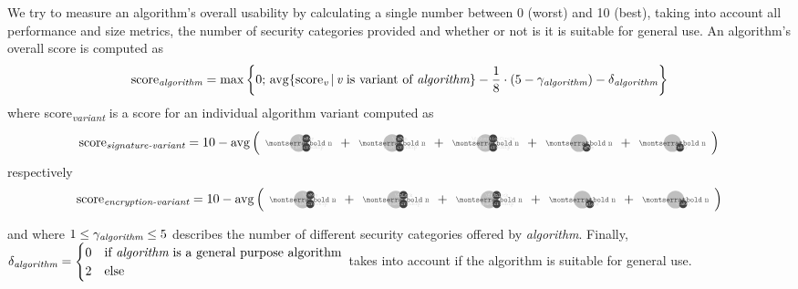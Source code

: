 \documentclass[11pt,english,a4paper, landscape]{scrartcl}
\begin{document}
	\scriptsize
	We try to measure an algorithm's overall usability by calculating a single number between 0 (worst) and 10 (best), taking into account all performance and size metrics, the number of security categories provided and whether or not is it is suitable for general use. An algorithm's overall score is computed as
	\begin{align*}
		\textnormal{score\textsubscript{\itshape algorithm}} = \max\left\{0;\,\operatorname{avg}\{\textnormal{score}_\textnormal{\itshape v}\,|\, \textnormal{{\itshape v} is variant of {\itshape algorithm}}\} - \frac{1}{8}\cdot\left(5-\gamma_\textnormal{\itshape algorithm}\right) - \delta_\textnormal{\itshape algorithm}\right\}
	\end{align*}
	where \textnormal{score\textsubscript{\itshape variant}} is a score for an individual algorithm variant computed as
			\begin{align*}
			\textnormal{score\textsubscript{\itshape signature-variant}} = 10 - \avg\left({\scriptsize
			\tripleicon{\montserratbold n}{\faMicrochip}{themegreylight!50}{0.6}{\faKey} + %
			\tripleicon{\montserratbold n}{\faMicrochip}{themegreylight!50}{0.6}{\faPen} + %
			\tripleicon{\montserratbold n}{\faMicrochip}{themegreylight!50}{0.6}{\faQuestionCircle} + %
			\doubleicon{\montserratbold n}{\faPen}{themegreylight!50}{0.6}+ %
			\doubleicon{\montserratbold n}{\faKey}{themegreylight!50}{0.6}
			}\right)
		\end{align*}
	respectively
		\begin{align*}
			\textnormal{score\textsubscript{\itshape encryption-variant}} = 10 - \avg\left({\scriptsize
			\tripleicon{\montserratbold n}{\faMicrochip}{themegreylight!50}{0.6}{\faKey} + %
			\tripleicon{\montserratbold n}{\faMicrochip}{themegreylight!50}{0.6}{\faLock} + %
			\tripleicon{\montserratbold n}{\faMicrochip}{themegreylight!50}{0.6}{\faUnlock} + %
			\doubleicon{\montserratbold n}{\faLock}{themegreylight!50}{0.6}+ %
			\doubleicon{\montserratbold n}{\faKey}{themegreylight!50}{0.6}
			}\right)
		\end{align*}

	and where $1\leq\gamma_\textnormal{\itshape algorithm}\leq 5$ describes the number of different security categories offered by {\itshape algorithm}. Finally, $\delta_\textnormal{\itshape algorithm} = \begin{cases}
      0 & \textnormal{if {\itshape algorithm} is a general purpose algorithm} \\
      2 & \textnormal{else}
   \end{cases}$	takes into account if the algorithm is suitable for general use.\\
\end{document}

